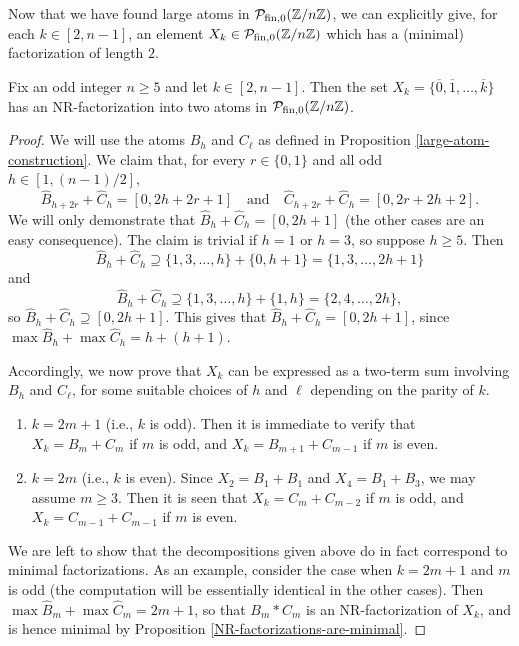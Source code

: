 Now that we have found large atoms in $\mathcal{P}_{\textrm{fin},0}(\mathbb{Z}/n\mathbb{Z})$, we can explicitly give, for each $k\in [ 2,n-1]$, an element $X_k\in \mathcal{P}_{\textrm{fin},0}(\mathbb{Z}/n\mathbb{Z})$ which has a (minimal) factorization of length $2$.

\begin{lemma}\label{2-atom-factorization}
Fix an odd integer $n\ge 5$ and let $k\in [ 2, n-1 ]$.
Then the set $X_k = \{\overline{0},\overline{1},\dots, \overline{k}\}$ has an \textup{NR}-factorization into two atoms in $\mathcal{P}_{\textrm{fin},0}(\mathbb{Z}/n\mathbb{Z})$.
\end{lemma}

\begin{proof}
We will use the atoms $B_h$ and $C_\ell$ as defined in Proposition \ref{large-atom-construction}. We claim that, for every $r\in\{0,1\}$ and all odd $h\in [ 1, (n-1)/2 ]$,
%
\[
\hat{B}_{h+2r}+\hat{C}_h = [ 0, 2h+2r+1 ]
\quad\text{and}\quad
\hat{C}_{h+2r} + \hat{C}_{h} = [ 0, 2r+2h+2].
\]
We will only demonstrate that $\hat{B}_h + \hat{C}_h = [ 0, 2h+1 ]$ (the other cases are an easy consequence).
The claim is trivial if $h=1$ or $h=3$, so suppose $h \ge 5$.
Then
\[
\hat{B}_h + \hat{C}_h \supseteq \{1,3,\dots,h\} + \{0, h+1\} = \{1,3,\dots, 2h+1\}
\]
and
\[
\hat{B}_h + \hat{C}_h \supseteq \{1,3,\dots,h\} + \{1, h\} = \{2,4,\dots, 2h\},
\]
so $\hat{B}_h +\hat{C}_h \supseteq [ 0 , 2h+1 ]$.
This gives that $\hat{B}_h +\hat{C}_h = [ 0 , 2h+1 ]$, since $\max\hat{B}_h+\max\hat{C}_h = h+(h+1)$.

Accordingly, we now prove that $X_k$ can be expressed as a two-term sum involving $B_h$ and $C_\ell$, for some suitable choices of $h$ and $\ell$ depending on the parity of $k$.
\begin{enumerate}[leftmargin=1.8cm,label={\textsc{Case }\arabic{*}:}]
	\item $k = 2m+1$ (i.e., $k$ is odd). Then it is immediate to verify that $X_k = B_m+C_m$ if $m$ is odd, and $X_k = B_{m+1} +C_{m-1}$ if $m$ is even.
	\item $k = 2m$ (i.e., $k$ is even). Since $X_2 = B_1+B_1$ and $X_4 = B_1+B_3$, we may assume $m\ge3$. Then it is seen that $X_k = C_{m} + C_{m-2}$ if $m$ is odd, and $X_k = C_{m-1}+C_{m-1}$ if $m$ is even.
\end{enumerate}
We are left to show that the decompositions given above do in fact correspond to minimal factorizations. As an example, consider the case when $k=2m+1$ and $m$ is odd (the computation will be essentially identical in the other cases).
Then $\max\hat{B}_{m}+\max\hat{C}_m = 2m+1$, so that $B_m \ast C_m$ is an NR-factorization of $X_k$, and is hence minimal by Proposition \ref{NR-factorizations-are-minimal}.
\end{proof}



